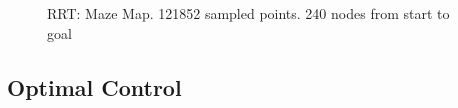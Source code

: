 \documentclass[letterpaper, 10 pt, conference]{ieeeconf}  %
\begin{document}
 \begin{figure}[h]
    \centering
    \caption{RRT: Maze Map. 121852 sampled points. 240 nodes from start to goal}
    \label{fig:map1}
 \end{figure}

 \subsection{Optimal Control}
 







\end{document}
